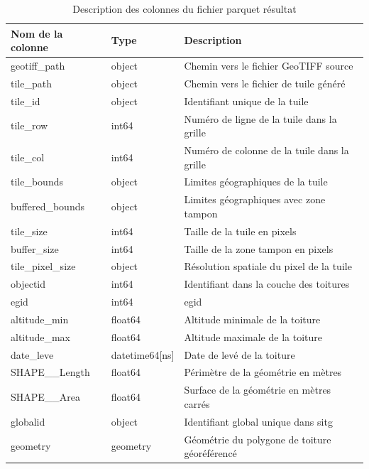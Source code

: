 \begin{table}[H]
    \centering
    \begin{tabular}{@{}llp{}@{}}
    \toprule
    \textbf{Nom de la colonne} & \textbf{Type} & \textbf{Description} \\
    \midrule
    geotiff\_path & object & Chemin vers le fichier GeoTIFF source \\
    tile\_path & object & Chemin vers le fichier de tuile généré \\
    tile\_id & object & Identifiant unique de la tuile \\
    tile\_row & int64 & Numéro de ligne de la tuile dans la grille \\
    tile\_col & int64 & Numéro de colonne de la tuile dans la grille \\
    tile\_bounds & object & Limites géographiques de la tuile \\
    buffered\_bounds & object & Limites géographiques avec zone tampon \\
    tile\_size & int64 & Taille de la tuile en pixels \\
    buffer\_size & int64 & Taille de la zone tampon en pixels \\
    tile\_pixel\_size & object & Résolution spatiale du pixel de la tuile \\
    objectid & int64 & Identifiant dans la couche des toitures \\
    egid & int64 & \gls{egid} \\
    altitude\_min & float64 & Altitude minimale de la toiture \\
    altitude\_max & float64 & Altitude maximale de la toiture\\
    date\_leve & datetime64[ns] & Date de levé de la toiture \\
    SHAPE\_\_Length & float64 & Périmètre de la géométrie en mètres \\
    SHAPE\_\_Area & float64 & Surface de la géométrie en mètres carrés \\
    globalid & object & Identifiant global unique dans \acrshort{sitg} \\
    geometry & geometry & Géométrie du polygone de toiture géoréférencé \\
    \bottomrule
    \end{tabular}
    \caption{Description des colonnes du fichier parquet résultat}
    \label{tab:ch3_preparation_donnees_orthophotos_parquet_resultat}
\end{table}


